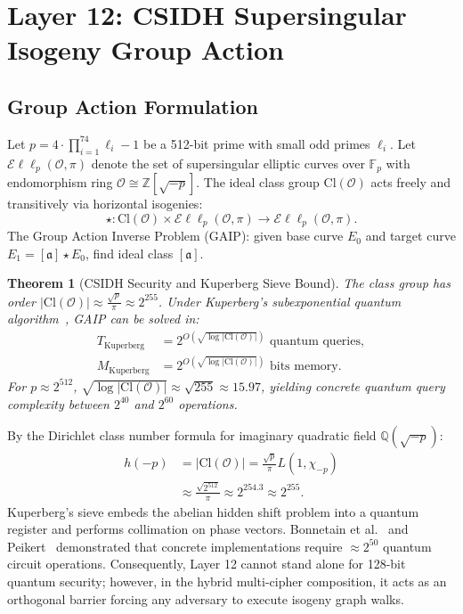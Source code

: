 \documentclass{ieeeaccess}
\newcommand{\Z}{\mathbb{Z}}
\newcommand{\F}{\mathbb{F}}
\newcommand{\calE}{\mathcal{E}}
\newcommand{\calO}{\mathcal{O}}
\newtheorem{theorem}{Theorem}
\newenvironment{proof}{\begin{IEEEproof}\IEEEQEDoff}{\end{IEEEproof}}
\begin{document}
\section{Layer 12: CSIDH Supersingular Isogeny Group Action}
\label{sec:L12}

\subsection{Group Action Formulation}
Let $p = 4 \cdot \prod_{i=1}^{74} \ell_i - 1$ be a 512-bit prime with small odd primes $\ell_i$.
Let $\calE\ell\ell_p(\calO, \pi)$ denote the set of supersingular elliptic curves over $\F_p$ with endomorphism ring $\calO \cong \Z[\sqrt{-p}]$.
The ideal class group $\mathrm{Cl}(\calO)$ acts freely and transitively via horizontal isogenies:
\begin{equation}
  \star : \mathrm{Cl}(\calO) \times \calE\ell\ell_p(\calO, \pi) \longrightarrow \calE\ell\ell_p(\calO, \pi).
\end{equation}
The Group Action Inverse Problem (GAIP): given base curve $E_0$ and target curve $E_1 = [\mathfrak{a}] \star E_0$, find ideal class $[\mathfrak{a}]$.

\begin{theorem}[CSIDH Security and Kuperberg Sieve Bound]
\label{thm:L12-csidh}
The class group has order $|\mathrm{Cl}(\calO)| \approx \frac{\sqrt{p}}{\pi} \approx 2^{255}$.
Under Kuperberg's subexponential quantum algorithm~\cite{Kuperberg2005,Peikert2020}, GAIP can be solved in:
\begin{equation}
\begin{aligned}
  T_{\mathrm{Kuperberg}} &= 2^{O(\sqrt{\log |\mathrm{Cl}(\calO)|})} \text{ quantum queries}, \\
  M_{\mathrm{Kuperberg}} &= 2^{O(\sqrt{\log |\mathrm{Cl}(\calO)|})} \text{ bits memory}.
\end{aligned}
\end{equation}
For $p \approx 2^{512}$, $\sqrt{\log |\mathrm{Cl}(\calO)|} \approx \sqrt{255} \approx 15.97$, yielding concrete quantum query complexity between $2^{40}$ and $2^{60}$ operations.
\end{theorem}
\begin{proof}
By the Dirichlet class number formula for imaginary quadratic field $\mathbb{Q}(\sqrt{-p})$:
\begin{equation}
\begin{aligned}
  h(-p) &= |\mathrm{Cl}(\calO)| = \frac{\sqrt{p}}{\pi} L(1, \chi_{-p}) \\
  &\approx \frac{\sqrt{2^{512}}}{\pi} \approx 2^{254.3} \approx 2^{255}.
\end{aligned}
\end{equation}
Kuperberg's sieve embeds the abelian hidden shift problem into a quantum register and performs collimation on phase vectors.
Bonnetain et al.~\cite{Castryck2018} and Peikert~\cite{Peikert2020} demonstrated that concrete implementations require $\approx 2^{50}$ quantum circuit operations.
Consequently, Layer 12 cannot stand alone for 128-bit quantum security; however, in the hybrid multi-cipher composition, it acts as an orthogonal barrier forcing any adversary to execute isogeny graph walks.
\end{proof}
\end{document}
